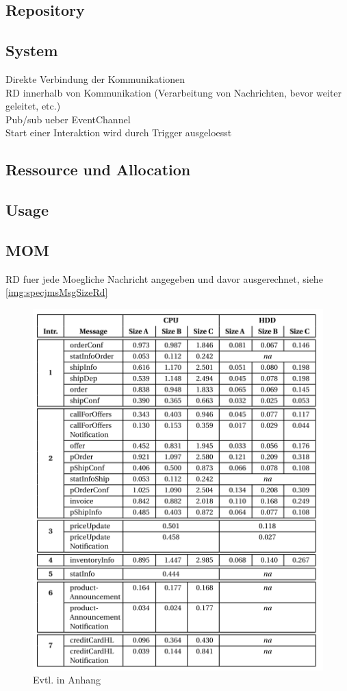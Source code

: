 \subsection{Repository}
\subsection{System}
Direkte Verbindung der Kommunikationen \\
RD innerhalb von Kommunikation (Verarbeitung von Nachrichten, bevor weiter geleitet, etc.)\\
Pub/sub ueber EventChannel \\
Start einer Interaktion wird durch Trigger ausgeloesst \\
\subsection{Ressource und Allocation}
\subsection{Usage}
\subsection{MOM}
RD fuer jede Moegliche Nachricht angegeben und davor ausgerechnet, siehe \autoref{img:specjmsMsgSizeRd} \\
\begin{figure}
\center
  \includegraphics[width=1\textwidth]{images/specjmsmsgsizerd.png}
  \caption{Evtl. in Anhang}
  \label{img:specjmsMsgSizeRd}
\end{figure}


